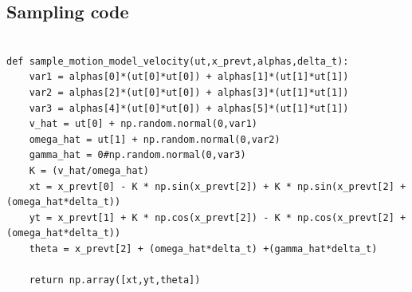\documentclass[10pt]{scrartcl}
\begin{document}
\newpage
\subsection{Sampling code}

\begin{lstlisting}
 
def sample_motion_model_velocity(ut,x_prevt,alphas,delta_t):
    var1 = alphas[0]*(ut[0]*ut[0]) + alphas[1]*(ut[1]*ut[1])
    var2 = alphas[2]*(ut[0]*ut[0]) + alphas[3]*(ut[1]*ut[1])
    var3 = alphas[4]*(ut[0]*ut[0]) + alphas[5]*(ut[1]*ut[1])
    v_hat = ut[0] + np.random.normal(0,var1)
    omega_hat = ut[1] + np.random.normal(0,var2)
    gamma_hat = 0#np.random.normal(0,var3)
    K = (v_hat/omega_hat)
    xt = x_prevt[0] - K * np.sin(x_prevt[2]) + K * np.sin(x_prevt[2] + (omega_hat*delta_t))
    yt = x_prevt[1] + K * np.cos(x_prevt[2]) - K * np.cos(x_prevt[2] + (omega_hat*delta_t))
    theta = x_prevt[2] + (omega_hat*delta_t) +(gamma_hat*delta_t)
    
    return np.array([xt,yt,theta])
    
\end{lstlisting}
\end{document}
